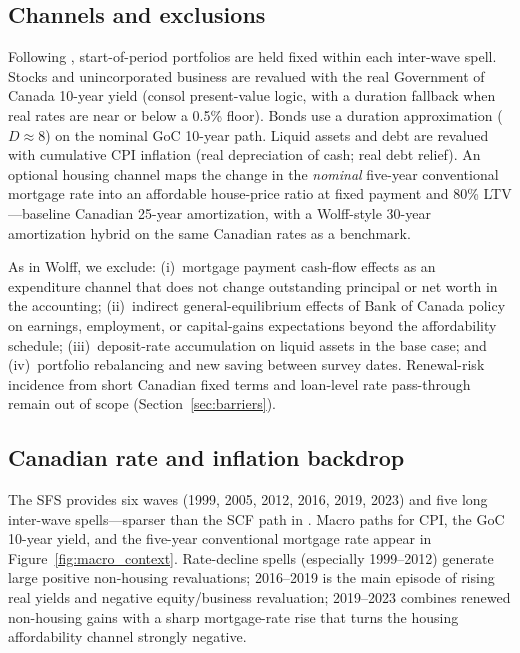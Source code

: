 \documentclass[11pt]{article}
\begin{document}
\subsection{Channels and exclusions}

Following \citet{wolff2021inflation}, start-of-period portfolios are held fixed within each inter-wave spell. Stocks and unincorporated business are revalued with the real Government of Canada 10-year yield (consol present-value logic, with a duration fallback when real rates are near or below a 0.5\% floor). Bonds use a duration approximation ($D\approx 8$) on the nominal GoC 10-year path. Liquid assets and debt are revalued with cumulative CPI inflation (real depreciation of cash; real debt relief). An optional housing channel maps the change in the \emph{nominal} five-year conventional mortgage rate into an affordable house-price ratio at fixed payment and 80\% LTV---baseline Canadian 25-year amortization, with a Wolff-style 30-year amortization hybrid on the same Canadian rates as a benchmark.

As in Wolff, we exclude: (i)~mortgage payment cash-flow effects as an expenditure channel that does not change outstanding principal or net worth in the accounting; (ii)~indirect general-equilibrium effects of Bank of Canada policy on earnings, employment, or capital-gains expectations beyond the affordability schedule; (iii)~deposit-rate accumulation on liquid assets in the base case; and (iv)~portfolio rebalancing and new saving between survey dates. Renewal-risk incidence from short Canadian fixed terms and loan-level rate pass-through remain out of scope (Section~\ref{sec:barriers}).

\subsection{Canadian rate and inflation backdrop}

The SFS provides six waves (1999, 2005, 2012, 2016, 2019, 2023) and five long inter-wave spells---sparser than the SCF path in \citet{wolff2021inflation}. Macro paths for CPI, the GoC 10-year yield, and the five-year conventional mortgage rate appear in Figure~\ref{fig:macro_context}. Rate-decline spells (especially 1999--2012) generate large positive non-housing revaluations; 2016--2019 is the main episode of rising real yields and negative equity/business revaluation; 2019--2023 combines renewed non-housing gains with a sharp mortgage-rate rise that turns the housing affordability channel strongly negative.
\end{document}
